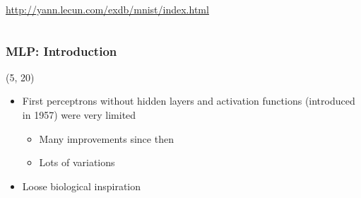 \begin{frame}
\begin{columns}
\begin{column}{0.5\textwidth}
      \url{http://yann.lecun.com/exdb/mnist/index.html}
    \end{column}
  \end{columns}
\end{frame}

\begin{frame}
  \frametitle{\acl{MLP}: Introduction}

  \begin{textblock}{80}(5, 20)
    \begin{itemize}
    \item<1-> First perceptrons without hidden layers and activation functions
      (introduced in 1957) were
      very limited
      \begin{itemize}
      \item Many improvements since then
      \item Lots of variations
      \end{itemize}
    \item<1-> Loose biological inspiration
    \end{itemize}
  \end{textblock}
\end{frame}

